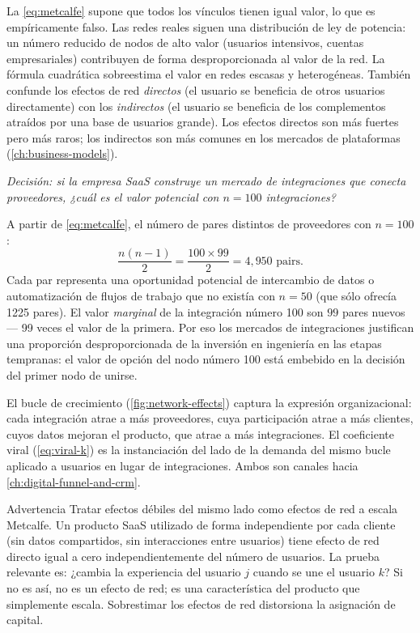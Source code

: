 La \cref{eq:metcalfe} supone que todos los vínculos tienen igual valor, lo que es
empíricamente falso. Las redes reales siguen una distribución de ley de potencia: un número
reducido de nodos de alto valor (usuarios intensivos, cuentas empresariales) contribuyen de
forma desproporcionada al valor de la red. La fórmula cuadrática sobreestima el valor en
redes escasas y heterogéneas. También confunde los efectos de red \emph{directos} (el
usuario se beneficia de otros usuarios directamente) con los \emph{indirectos} (el usuario
se beneficia de los complementos atraídos por una base de usuarios grande). Los efectos
directos son más fuertes pero más raros; los indirectos son más comunes en los mercados de
plataformas (\cref{ch:business-models}).

\begin{example}
\emph{Decisión: si la empresa SaaS construye un mercado de integraciones que conecta
proveedores, ¿cuál es el valor potencial con \(n = 100\) integraciones?}

A partir de \cref{eq:metcalfe}, el número de pares distintos de proveedores con \(n = 100\):
\[
  \frac{n(n-1)}{2} = \frac{100 \times 99}{2} = 4{,}950 \text{ pairs}.
\]
Cada par representa una oportunidad potencial de intercambio de datos o automatización de
flujos de trabajo que no existía con \(n = 50\) (que sólo ofrecía \num{1225} pares). El
valor \emph{marginal} de la integración número 100 son \(99\) pares nuevos --- 99 veces el
valor de la primera. Por eso los mercados de integraciones justifican una proporción
desproporcionada de la inversión en ingeniería en las etapas tempranas: el valor de opción
del nodo número 100 está embebido en la decisión del primer nodo de unirse.

El bucle de crecimiento (\cref{fig:network-effects}) captura la expresión organizacional:
cada integración atrae a más proveedores, cuya participación atrae a más clientes, cuyos
datos mejoran el producto, que atrae a más integraciones. El coeficiente viral
(\cref{eq:viral-k}) es la instanciación del lado de la demanda del mismo bucle aplicado a
usuarios en lugar de integraciones. Ambos son canales hacia \cref{ch:digital-funnel-and-crm}.
\end{example}

\begin{admonition}{Advertencia}
Tratar efectos débiles del mismo lado como efectos de red a escala Metcalfe. Un producto
SaaS utilizado de forma independiente por cada cliente (sin datos compartidos, sin
interacciones entre usuarios) tiene efecto de red directo igual a cero independientemente
del número de usuarios. La prueba relevante es: ¿cambia la experiencia del usuario \(j\)
cuando se une el usuario \(k\)? Si no es así, no es un efecto de red; es una característica
del producto que simplemente escala. Sobrestimar los efectos de red distorsiona la
asignación de capital.
\end{admonition}

